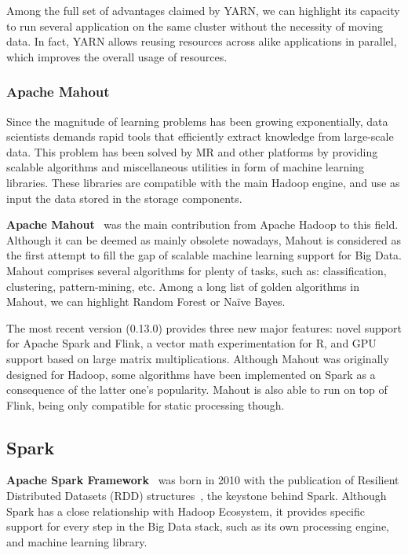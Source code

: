 \documentclass[3p,review]{elsarticle}
\begin{document}
Among the full set of advantages claimed by YARN, we can highlight its capacity to run several application on the same cluster without the necessity of moving data. In fact, YARN allows reusing resources across alike applications in parallel, which improves the overall usage of resources.

\subsubsection{Apache Mahout}

Since the magnitude of learning problems has been growing exponentially, data scientists demands rapid tools that efficiently extract knowledge from large-scale data. This problem has been solved by MR and other platforms by providing scalable algorithms and miscellaneous utilities in form of machine learning libraries. These libraries are compatible with the main Hadoop engine, and use as input the data stored in the storage components. 

\textbf{Apache Mahout}~\cite{mahout} was the main contribution from Apache Hadoop to this field. Although it can be deemed as mainly obsolete nowadays, Mahout is considered as the first attempt to fill the gap of scalable machine learning support for Big Data. Mahout comprises several algorithms for plenty of tasks, such as: classification, clustering, pattern-mining, etc. Among a long list of golden algorithms in Mahout, we can highlight Random Forest or Na\"ive Bayes. 

The most recent version (0.13.0) provides three new major features: novel support for Apache Spark and Flink, a vector math experimentation for R, and GPU support based on large matrix multiplications. Although Mahout was originally designed for Hadoop, some algorithms have been implemented on Spark as a consequence of the latter one's popularity. Mahout is also able to run on top of Flink, being only compatible for static processing though.

\subsection{Spark}\label{subsec:spark}

\textbf{Apache Spark Framework}~\cite{spark} was born in 2010 with the publication of Resilient Distributed Datasets (RDD) structures~\cite{zaharia12}, the keystone behind Spark. Although Spark has a close relationship with Hadoop Ecosystem, it provides specific support for every step in the Big Data stack, such as its own processing engine, and machine learning library. 
\end{document}
